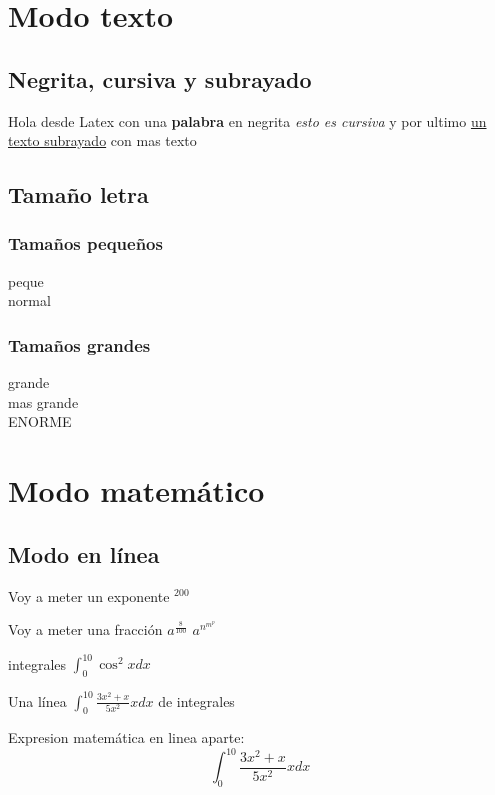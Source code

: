 \documentclass[10pt, a4paper]{report}
\begin{document}
\pagebreak
\tableofcontents
\pagebreak

\chapter{Modo texto}

\section{Negrita, cursiva y subrayado}

Hola desde Latex con
una {\bf palabra} en negrita
{\it esto es cursiva} y
por ultimo
\underline {un texto subrayado} con mas texto

\section{Tamaño letra}

\subsection{Tamaños pequeños}
{\tiny peque \\}
{\normalsize normal \\}
\subsection{Tamaños grandes}
{\large grande \\}
{\LARGE mas grande \\}
{\Huge ENORME \\}

\chapter{Modo matemático}

\section{Modo en línea}

Voy a meter un exponente $^{200} $

Voy a meter una fracción $ a^{\frac{8}{100}} $
$ a^{n^{m^{p}}} $

integrales $ \int_{0}^{10} \cos^2 x dx $

Una línea $ \int_{0}^{10} \frac{3x^2+x}{5x^2} x dx $ de integrales

Expresion matemática en linea aparte: 
$$ \int_{0}^{10} \frac{3x^2+x}{5x^2} x dx $$
\end{document}
